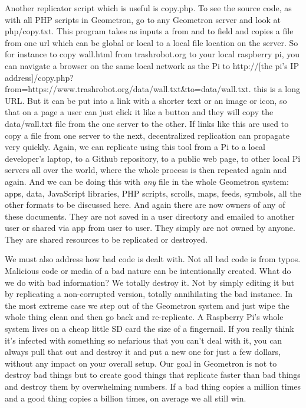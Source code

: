 Another replicator script which is useful is copy.php.  To see the source code, as with all PHP scripts in Geometron, go to any Geometron server and look at php/copy.txt.  This program takes as inputs a from and to field and copies a file from one url which can be global or local to a local file location on the server.  So for instance to copy wall.html from trashrobot.org to your local raspberry pi, you can navigate a browser on the same local network as the Pi to http://[the pi's IP address]/copy.php?from=https://www.trashrobot.org/data/wall.txt&to=data/wall.txt.  this is a long URL.  But it can be put into a link with a shorter text or an image or icon, so that on a page a user can just click it like a button and they will copy the data/wall.txt file from the one server to the other.  If links like this are used to copy a file from one server to the next, decentralized replication can propagate very quickly.  Again, we can replicate using this tool from a Pi to a local developer's laptop, to a Github repository, to a public web page, to other local Pi servers all over the world, where the whole process is then repeated again and again.  And we can be doing this with \emph{any} file in the whole Geometron system: apps, data, JavaScript libraries, PHP scripts, scrolls, maps, feeds, symbols, all the other formats to be discussed here.  And again there are now owners of any of these documents.  They are not saved in a user directory and emailed to another user or shared via app from user to user.  They simply are not owned by anyone.  They are shared resources to be replicated or destroyed.  

We must also address how bad code is dealt with.  Not all bad code is from typos.  Malicious code or media of a bad nature can be intentionally created. What do we do with bad information? We totally destroy it.  Not by simply editing it but by replicating a non-corrupted version, totally annihilating the bad instance.  In the most extreme case we step out of the Geometron system and just wipe the whole thing clean and then go back and re-replicate.  A Raspberry Pi's whole system lives on a cheap little SD card the size of a fingernail.  If you really think it's infected with something so nefarious that you can't deal with it, you can always pull that out and destroy it and put a new one for just a few dollars, without any impact on your overall setup.  Our goal in Geometron is not to destroy bad things but to create good things that replicate faster than bad things and destroy them by overwhelming numbers.  If a bad thing copies a million times and a good thing copies a billion times, on average we all still win.  

